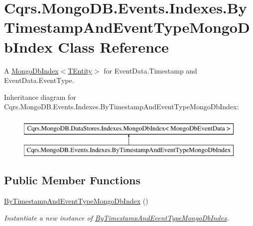 \hypertarget{classCqrs_1_1MongoDB_1_1Events_1_1Indexes_1_1ByTimestampAndEventTypeMongoDbIndex}{}\section{Cqrs.\+Mongo\+D\+B.\+Events.\+Indexes.\+By\+Timestamp\+And\+Event\+Type\+Mongo\+Db\+Index Class Reference}
\label{classCqrs_1_1MongoDB_1_1Events_1_1Indexes_1_1ByTimestampAndEventTypeMongoDbIndex}


A \hyperlink{classCqrs_1_1MongoDB_1_1DataStores_1_1Indexes_1_1MongoDbIndex_a61f4b17dd968f92e81562c70ae062a89_a61f4b17dd968f92e81562c70ae062a89}{Mongo\+Db\+Index$<$\+T\+Entity$>$} for Event\+Data.\+Timestamp and Event\+Data.\+Event\+Type.  


Inheritance diagram for Cqrs.\+Mongo\+D\+B.\+Events.\+Indexes.\+By\+Timestamp\+And\+Event\+Type\+Mongo\+Db\+Index\+:\begin{figure}[H]
\begin{center}
\leavevmode
\includegraphics[height=2.000000cm]{classCqrs_1_1MongoDB_1_1Events_1_1Indexes_1_1ByTimestampAndEventTypeMongoDbIndex}
\end{center}
\end{figure}
\subsection*{Public Member Functions}
\begin{DoxyCompactItemize}
\item 
\hyperlink{classCqrs_1_1MongoDB_1_1Events_1_1Indexes_1_1ByTimestampAndEventTypeMongoDbIndex_ac31e888bf88b4cabc9f7be0dd1fc3ffc_ac31e888bf88b4cabc9f7be0dd1fc3ffc}{By\+Timestamp\+And\+Event\+Type\+Mongo\+Db\+Index} ()
\begin{DoxyCompactList}\small\item\em Instantiate a new instance of \hyperlink{classCqrs_1_1MongoDB_1_1Events_1_1Indexes_1_1ByTimestampAndEventTypeMongoDbIndex}{By\+Timestamp\+And\+Event\+Type\+Mongo\+Db\+Index}. \end{DoxyCompactList}\end{DoxyCompactItemize}
